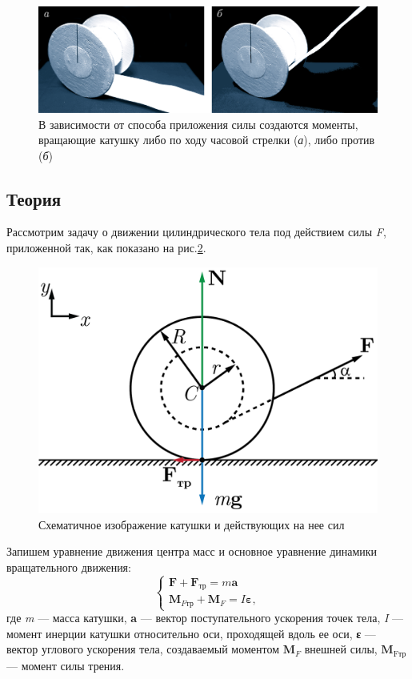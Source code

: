 \documentclass[All.tex]{subfiles}
\begin{document}
\begin{figure}[H] 
	\centering 		
	\includegraphics[width=0.9\linewidth]{roll-2.png} 
	\caption{В зависимости от способа приложения силы создаются моменты, вращающие катушку либо по ходу часовой стрелки (\textit{а}), либо против (\textit{б})}
	\label{roll-2}
\end{figure}

\subsection*{\textcolor{PineGreen}{Теория}}
Рассмотрим задачу о движении цилиндрического тела под действием силы \textit{F}, приложенной так, как показано на рис.\ref{roll-3}.

\begin{figure}[H] 
	\centering 		
	\includegraphics[width=0.6\linewidth]{roll-3.png} 
	\caption{Схематичное изображение катушки и действующих на нее сил}
	\label{roll-3}
\end{figure}

Запишем уравнение движения центра масс и основное уравнение динамики вращательного движения:
\begin{equation}\label{roll-eq1}
\begin{cases}
\textbf{F} + \textbf{F}_{\text{тр}} = m\textbf{a} \\
\textbf{M}_{F\text{тр}} + \textbf{M}_F= I\textbf{ε},
\end{cases}
\end{equation}
где \textit{m} — масса катушки, \textbf{a} — вектор поступательного ускорения точек тела, \textit{I} — момент инерции катушки относительно оси, проходящей вдоль ее оси, \textbf{ε} — вектор углового ускорения тела, создаваемый моментом $ \textbf{M}_F $ внешней силы, $ \textbf{M}_{\text{Fтр}} $ — момент силы трения.
\end{document}
